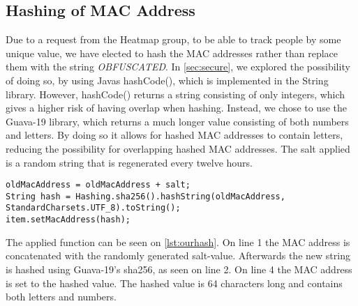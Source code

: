 \subsection*{Hashing of MAC Address}
Due to a request from the Heatmap group, to be able to track people by some unique value, we have elected to hash the MAC addresses rather than replace them with the string \emph{OBFUSCATED}. In \cref{sec:secure}, we explored the possibility of doing so, by using Javas hashCode(), which is implemented in the String library. However, hashCode() returns a string consisting of only integers, which gives a higher risk of having overlap when hashing. Instead, we chose to use the Guava-19 library, which returns a much longer value consisting of both numbers and letters. By doing so it allows for hashed MAC addresses to contain letters, reducing the possibility for overlapping hashed MAC addresses. The salt applied is a random string that is regenerated every twelve hours. 

\begin{lstlisting}[caption={Hashing a MAC address},label={lst:ourhash},language=inc_Java]
oldMacAddress = oldMacAddress + salt;
String hash = Hashing.sha256().hashString(oldMacAddress, 
StandardCharsets.UTF_8).toString();
item.setMacAddress(hash);
\end{lstlisting}

The applied function can be seen on \cref{lst:ourhash}. On line 1 the MAC address is concatenated with the randomly generated salt-value. Afterwards the new string is hashed using Guava-19's sha256, as seen on line 2. On line 4 the MAC address is set to the hashed value. The hashed value is 64 characters long and contains both letters and numbers.